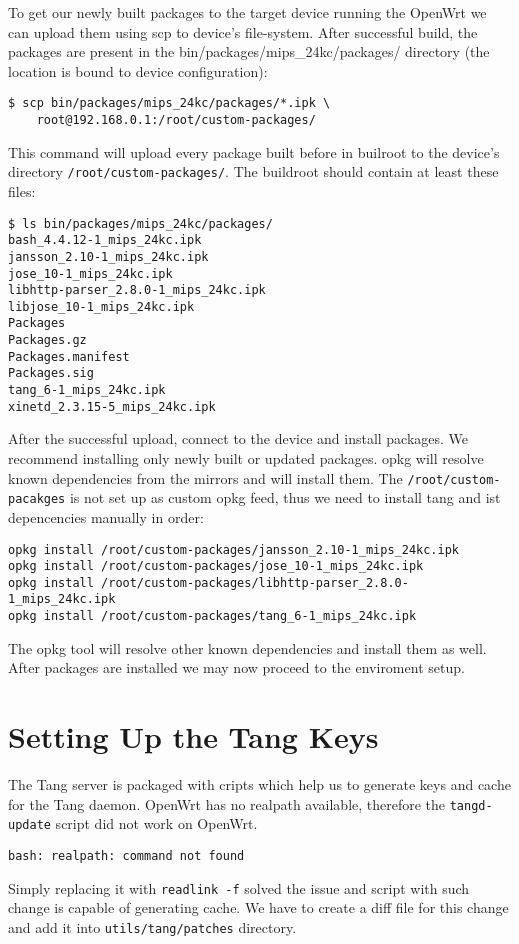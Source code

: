 To get our newly built packages to the target device running the OpenWrt we can upload them using scp to device's file-system.
After successful build, the packages are present in the bin/packages/mips\_24kc/packages/ directory (the location is bound to device configuration):
\begin{lstlisting}[columns=fixed,basicstyle=\ttfamily\footnotesize,tabsize=4,backgroundcolor=\color{yellow!10}]
$ scp bin/packages/mips_24kc/packages/*.ipk \
    root@192.168.0.1:/root/custom-packages/
\end{lstlisting}
This command will upload every package built before in builroot to the device's directory {\tt /root/custom-packages/}.
The buildroot should contain at least these files:
\begin{lstlisting}[columns=fixed,basicstyle=\ttfamily\footnotesize,tabsize=4,backgroundcolor=\color{yellow!10}]
$ ls bin/packages/mips_24kc/packages/
bash_4.4.12-1_mips_24kc.ipk
jansson_2.10-1_mips_24kc.ipk
jose_10-1_mips_24kc.ipk
libhttp-parser_2.8.0-1_mips_24kc.ipk
libjose_10-1_mips_24kc.ipk
Packages
Packages.gz
Packages.manifest
Packages.sig
tang_6-1_mips_24kc.ipk
xinetd_2.3.15-5_mips_24kc.ipk
\end{lstlisting}
After the successful upload, connect to the device and install packages.
We recommend installing only newly built or updated packages.
opkg will resolve known dependencies from the mirrors and will install them.
The {\tt /root/custom-pacakges} is not set up as custom opkg feed, thus we need to install tang and ist depencencies manually in order:
\begin{lstlisting}[columns=fixed,basicstyle=\ttfamily\footnotesize,tabsize=4,backgroundcolor=\color{yellow!10}]
opkg install /root/custom-packages/jansson_2.10-1_mips_24kc.ipk
opkg install /root/custom-packages/jose_10-1_mips_24kc.ipk
opkg install /root/custom-packages/libhttp-parser_2.8.0-1_mips_24kc.ipk
opkg install /root/custom-packages/tang_6-1_mips_24kc.ipk
\end{lstlisting}
The opkg tool will resolve other known dependencies and install them as well.
After packages are installed we may now proceed to the enviroment setup.



\section{Setting Up the Tang Keys}
The Tang server is packaged with cripts which help us to generate keys and cache for the Tang daemon.
OpenWrt has no realpath available, therefore the {\tt tangd-update} script did not work on OpenWrt.
\begin{lstlisting}[columns=fixed,basicstyle=\ttfamily\footnotesize,tabsize=4,backgroundcolor=\color{yellow!10}]
bash: realpath: command not found
\end{lstlisting}
Simply replacing it with {\tt readlink -f} solved the issue and script with such change is capable of generating cache.
We have to create a diff file for this change and add it into {\tt utils/tang/patches} directory.

